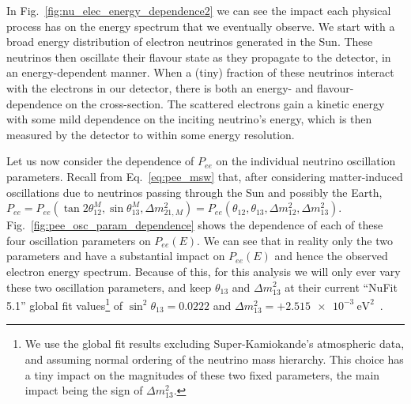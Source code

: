 In Fig.~\ref{fig:nu_elec_energy_dependence2} we can see the impact each physical process has on the energy spectrum that we eventually observe. We start with a broad energy distribution of \beight{} electron neutrinos generated in the Sun. These neutrinos then oscillate their flavour state as they propagate to the detector, in an energy-dependent manner. When a (tiny) fraction of these neutrinos interact with the electrons in our detector, there is both an energy- and flavour-dependence on the cross-section. The scattered electrons gain a kinetic energy with some mild dependence on the inciting neutrino's energy, which is then measured by the detector to within some energy resolution.

Let us now consider the dependence of $P_{ee}$ on the individual neutrino oscillation parameters. Recall from Eq.~\ref{eq:pee_msw} %
that, after considering matter-induced oscillations due to neutrinos passing through the Sun and possibly the Earth, $P_{ee} = P_{ee}\left(\tan2\theta^{M}_{12}, \sin\theta^{M}_{13}, \Delta m^{2}_{21,M}\right) = P_{ee}\left(\theta_{12}, \theta_{13}, \Delta m^{2}_{12}, \Delta m^{2}_{13}\right)$. Fig.~\ref{fig:pee_osc_param_dependence} shows the dependence of each of these four oscillation parameters on $P_{ee}(E)$. We can see that in reality only the two parameters \dmsq{} and \tonetwo{} have a substantial impact on $P_{ee}(E)$ and hence the observed electron energy spectrum. Because of this, for this analysis we will only ever vary these two oscillation parameters, and keep $\theta_{13}$ and $\Delta m^{2}_{13}$ at their current ``NuFit 5.1'' global fit values\footnote{We use the global fit results excluding Super-Kamiokande's atmospheric data, and assuming normal ordering of the neutrino mass hierarchy. This choice has a tiny impact on the magnitudes of these two fixed parameters, the main impact being the sign of $\Delta m^{2}_{13}$.} %
of $\sin^{2}\theta_{13} = 0.0222$ and $\Delta m^{2}_{13} = +\SI{2.515e-3}{\eV\squared}$~\cite{estebanFateHintsUpdated2020}.%

